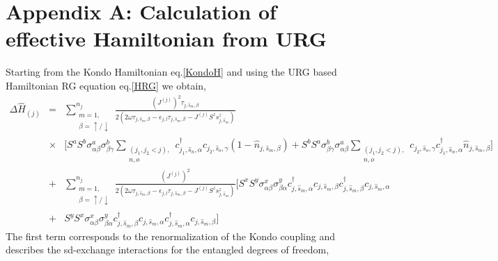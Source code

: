\documentclass[aps,prl,preprint,groupedaddress]{revtex4-2}
\begin{document}
\section*{Appendix A: Calculation of effective Hamiltonian from URG}\label{Appendix-A}
\par\noindent
Starting from the Kondo Hamiltonian eq.\eqref{KondoH} and using the URG based Hamiltonian RG equation eq.\eqref{HRG} we obtain,
\begin{eqnarray}
\Delta\hat{H}_{(j)} &=& \sum_{\substack{m=1,\\ \beta=\uparrow/\downarrow}}^{n_{j}}\frac{(J^{(j)})^{2}\tau_{j,\hat{s}_{m},\beta}}{2(2\omega\tau_{j,\hat{s}_{m},\beta} - \epsilon_{j,l}\tau_{j,\hat{s}_{m},\beta}-J^{(j)}S^{z}s^{z}_{j,\hat{s}_{m}})}\nonumber\\
&\times & \bigg[S^{a}S^{b}\sigma^{a}_{\alpha\beta}\sigma^{b}_{\beta\gamma} \sum_{\substack{(j_{1},j_{2}< j),\\ n,o}}c^{\dagger}_{j_{1},\hat{s}_{n},\alpha}c_{j_{2},\hat{s}_{o},\gamma}(1-\hat{n}_{j,\hat{s}_{m},\beta})+S^{b}S^{a}\sigma^{b}_{\beta\gamma}\sigma^{a}_{\alpha\beta} \sum_{\substack{(j_{1},j_{2}<j),\\ n,o}}c_{j_{2},\hat{s}_{o},\gamma}c^{\dagger}_{j_{1},\hat{s}_{n},\alpha}\hat{n}_{j,\hat{s}_{m},\beta}\bigg]\nonumber\\
&+&\sum_{\substack{m=1,\\ \beta=\uparrow/\downarrow}}^{n_{j}}\frac{(J^{(j)})^{2}}{2(2\omega\tau_{j,\hat{s}_{m},\beta} - \epsilon_{j,l}\tau_{j,\hat{s}_{m},\beta}-J^{(j)}S^{z}s^{z}_{j,\hat{s}_{m}})}\bigg[S^{x}S^{y}\sigma^{x}_{\alpha\beta}\sigma^{y}_{\beta\alpha}c^{\dagger}_{j,\hat{s}_{m},\alpha}c_{j,\hat{s}_{m},\beta}c^{\dagger}_{j,\hat{s}_{m},\beta}c_{j,\hat{s}_{m},\alpha}\nonumber\\
&+&S^{y}S^{x}\sigma^{x}_{\alpha\beta}\sigma^{y}_{\beta\alpha}c^{\dagger}_{j,\hat{s}_{m},\beta}c_{j,\hat{s}_{m},\alpha}c^{\dagger}_{j,\hat{s}_{m},\alpha}c_{j,\hat{s}_{m},\beta}\bigg]
\end{eqnarray}
The first term corresponds to the renormalization of the Kondo coupling and describes the sd-exchange interactions for the entangled degrees of freedom,
\end{document}
